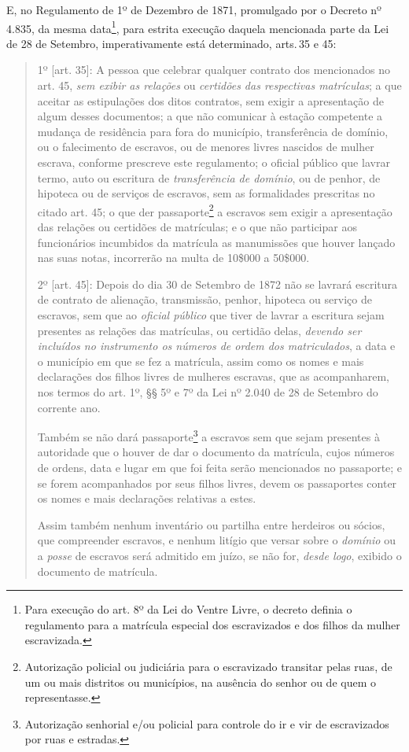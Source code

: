 E, no Regulamento de 1º de Dezembro de 1871, promulgado por o Decreto nº
4.835, da mesma data\footnote{Para execução do art. 8º da Lei do
  Ventre Livre, o decreto definia o regulamento para a matrícula
  especial dos escravizados e dos filhos da mulher escravizada.}, para
estrita execução daquela mencionada parte da Lei de 28 de Setembro,
imperativamente está determinado, arts.\,35 e 45:

\begin{quote}
1º {[}art. 35{]}: A pessoa que celebrar qualquer contrato dos
mencionados no art. 45, \emph{sem exibir as relações} ou \emph{certidões
das respectivas matrículas}; a que aceitar as estipulações dos ditos
contratos, sem exigir a apresentação de algum desses documentos; a que
não comunicar à estação competente a mudança de residência para fora do
município, transferência de domínio, ou o falecimento de escravos, ou de
menores livres nascidos de mulher escrava, conforme prescreve este
regulamento; o oficial público que lavrar termo, auto ou escritura de
\emph{transferência de domínio}, ou de penhor, de hipoteca ou de
serviços de escravos, sem as formalidades prescritas no citado art. 45;
o que der passaporte\footnote{Autorização policial ou judiciária para
  o escravizado transitar pelas ruas, de um ou mais distritos ou
  municípios, na ausência do senhor ou de quem o representasse.} a escravos
sem exigir a apresentação das relações ou certidões de matrículas; e o
que não participar aos funcionários incumbidos da matrícula as
manumissões que houver lançado nas suas notas, incorrerão na multa de
10\$000 a 50\$000.

2º {[}art. 45{]}: Depois do dia 30 de Setembro de 1872 não se lavrará
escritura de contrato de alienação, transmissão, penhor, hipoteca ou
serviço de escravos, sem que ao \emph{oficial público} que tiver de
lavrar a escritura sejam presentes as relações das matrículas, ou
certidão delas, \emph{devendo ser incluídos no instrumento os números de
ordem dos matriculados}, a data e o município em que se fez a matrícula,
assim como os nomes e mais declarações dos filhos livres de mulheres
escravas, que as acompanharem, nos termos do art. 1º, §§ 5º e 7º da Lei
nº 2.040 de 28 de Setembro do corrente ano.

Também se não dará passaporte\footnote{Autorização senhorial e/ou
  policial para controle do ir e vir de escravizados por ruas e
  estradas.} a escravos sem que sejam presentes à autoridade que o
houver de dar o documento da matrícula, cujos números de ordens, data e
lugar em que foi feita serão mencionados no passaporte; e se forem
acompanhados por seus filhos livres, devem os passaportes conter os
nomes e mais declarações relativas a estes.

Assim também nenhum inventário ou partilha entre herdeiros ou sócios,
que compreender escravos, e nenhum litígio que versar sobre o
\emph{domínio} ou a \emph{posse} de escravos será admitido em juízo, se
não for, \emph{desde logo}, exibido o documento de matrícula.
\end{quote}

